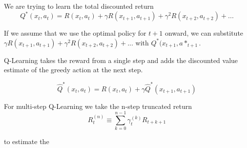 We are trying to learn the total discounted return
$$Q^{*}(x_t, a_t)=R(x_t, a_t)+\gamma R(x_{t+1}, a_{t+1})+\gamma^2 R(x_{t+2}, a_{t+2}) + ...$$

If we assume that we use the optimal policy for $t+1$ onward, we can substitute $\gamma R(x_{t+1}, a_{t+1})+\gamma^2 R(x_{t+2}, a_{t+2}) + ...$ with $Q^{*}(x_{t+1}, a*_{t+1}$.

Q-Learning takes the reward from a single step and adds the discounted value estimate of the greedy action at the next step.

$$\hat{Q}^{*}(x_t, a_t)=R(x_t, a_t)+\gamma \hat{Q}^{*}(x_{t+1}, a_{t+1})$$

For multi-step Q-Learning we take the n-step truncated return
$$R_{t}^{(n)} \equiv \sum_{k=0}^{n-1} \gamma_{t}^{(k)} R_{t+k+1}$$

to estimate the
